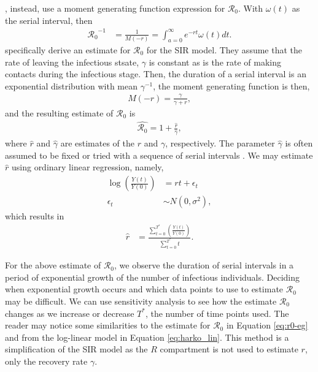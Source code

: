 \message{ !name(draft_v13.tex)}\documentclass[12pt]{article}
\newcommand{\rr}{\ensuremath{\mathcal{R}_0}}
\begin{document}
\cite{wallinga2007generation}, instead, use a moment generating function expression for $\rr$.  With $\omega(t)$ as the serial interval, then
\begin{align*}
\rr^{-1} &= \frac{1}{M(-r)} = \int_{a=0}^\infty e^{-rt}\omega(t)dt.
\end{align*}
\cite{wallinga2007generation} specifically derive an estimate for $\rr$ for the SIR model.  They assume that the rate of leaving the infectious stsate, $\gamma$ is constant as is the rate of making contacts during the infectious stage.  Then, the duration of a serial interval is an exponential distribution with mean $\gamma^{-1}$, the moment generating function is then,
\begin{align*}
  M(-r) = \frac{\gamma}{\gamma + r},
\end{align*}
and the resulting estimate of $\rr$ is
\begin{align}\label{eq:r0-eg}
  \hat{\rr} = 1 + \frac{\hat{r}}{\hat{\gamma}},
\end{align}
where $\hat{r}$ and $\hat{\gamma}$ are estimates of the $r$ and $\gamma$, respectively.  The parameter $\hat{\gamma}$ is often assumed to be fixed or tried with a sequence of serial intervals \citep{majumder2016}.  We may estimate $\hat{r}$ using ordinary linear regression, namely,
\begin{align*}
  \log \left  (\frac{Y(t)}{Y(0)} \right )&= rt + \epsilon_t\\
  \epsilon_t &\sim N(0, \sigma^2),
\end{align*}
which results in
\begin{align}\label{eq:exp-growth}
  \hat{r} &= \frac{\sum_{t=0}^{T^*}\left  (\frac{Y(t)}{Y(0)} \right )}{\sum_{t=0}^{T^*}t}.
\end{align}



For the above estimate of $\rr$, we observe the duration of serial intervals in a period of exponential growth of the number of infectious individuals.  Deciding when exponential growth occurs and which data points to use to estimate $\rr$ may be difficult.  We can use sensitivity analysis to see how the estimate $\rr$ changes as we increase or decrease $T^{*}$, the number of time points used. The reader may notice some similarities to the estimate for $\rr$ in Equation \eqref{eq:r0-eg} and from the log-linear model in Equation \eqref{eq:harko_lin}.  This method is a simplification of the SIR model as the $R$ compartment is not used to estimate $r$, only the recovery rate $\gamma$. 
\end{document}
